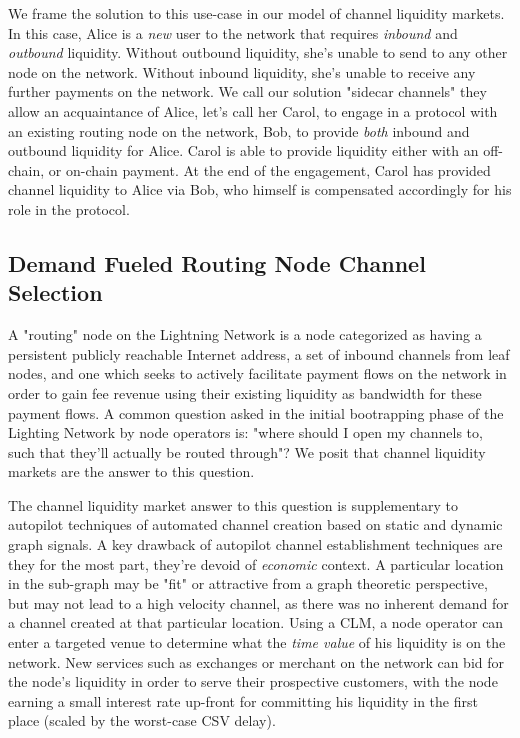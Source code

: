 \documentclass[12pt,a4paper]{article}
\theoremstyle{definition}
\begin{document}
We frame the solution to this use-case in our model of channel liquidity
markets. In this case, Alice is a \emph{new} user to the network that requires
\emph{inbound} and \emph{outbound} liquidity. Without outbound liquidity, she's
unable to send to any other node on the network. Without inbound liquidity,
she's unable to receive any further payments on the network. We call our
solution "sidecar channels" they allow an acquaintance of Alice, let's call her
Carol, to engage in a protocol with an existing routing node on the network,
Bob, to provide \emph{both} inbound and outbound liquidity for Alice. Carol is
able to provide liquidity either with an off-chain, or on-chain payment. At the
end of the engagement, Carol has provided channel liquidity to Alice via Bob,
who himself is compensated accordingly for his role in the protocol. 

\subsection{Demand Fueled Routing Node Channel Selection}

A "routing" node on the Lightning Network is a node categorized as having a
persistent publicly reachable Internet address, a set of inbound channels from
leaf nodes, and one which seeks to actively facilitate payment flows on the
network in order to gain fee revenue using their existing liquidity as
bandwidth for these payment flows. A common question asked in the initial
bootrapping phase of the Lighting Network by node operators is: "where should I
open my channels to, such that they'll actually be routed through"? We posit
that channel liquidity markets are the answer to this question.

The channel liquidity market answer to this question is  supplementary to
autopilot \cite{autopilot} techniques of automated channel creation based on
static and dynamic graph signals. A key drawback of autopilot channel
establishment techniques are they for the most part, they're devoid of
\emph{economic} context. A particular location in the sub-graph may be "fit" or
attractive from a graph theoretic perspective, but may not lead to a high
velocity channel, as there was no inherent demand for a channel created at that
particular location. Using a CLM, a node operator can enter a targeted venue to
determine what the \emph{time value} of his liquidity is on the network. New
services such as exchanges or merchant on the network can bid for the node's
liquidity in order to serve their prospective customers, with the node earning
a small interest rate up-front for committing his liquidity in the first place
(scaled by the worst-case CSV delay). 
\end{document}
